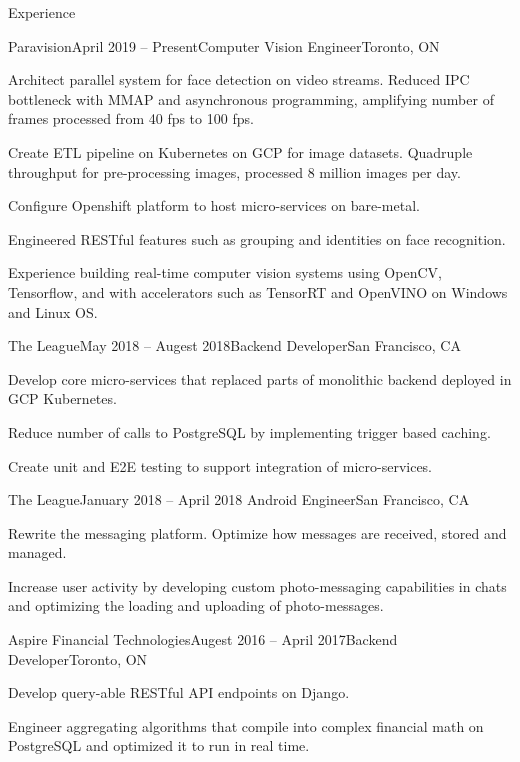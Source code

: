 \documentclass{resume}
\begin{document}
  \begin{rSection}{Experience}

    \begin{rSubsection}{Paravision}{April 2019 – Present}{Computer Vision Engineer}{Toronto, ON}
    \item Architect parallel system for face detection on video streams. Reduced IPC bottleneck with MMAP and asynchronous programming, amplifying number of frames processed from 40 fps to 100 fps.
    \item Create ETL pipeline on Kubernetes on GCP for image datasets. Quadruple throughput for pre-processing images, processed 8 million images per day.
    \item Configure Openshift platform to host micro-services on bare-metal.
    \item Engineered RESTful features such as grouping and identities on face recognition.
    \item Experience building real-time computer vision systems using OpenCV, Tensorflow, and with accelerators such as TensorRT and OpenVINO on Windows and Linux OS.
    \end{rSubsection}
    \vspace{-1em}
    \begin{rSubsection}{The League}{May 2018 – Augest 2018}{Backend Developer}{San Francisco, CA}
    \item Develop core micro-services that replaced parts of monolithic backend deployed in GCP Kubernetes.
    \item Reduce number of calls to PostgreSQL by implementing trigger based caching.
    \item Create unit and E2E testing to support integration of micro-services.
    \end{rSubsection}
    \vspace{-1em}
    \begin{rSubsection}{The League}{January 2018 – April 2018 }{Android Engineer}{San Francisco, CA}
    \item Rewrite the messaging platform. Optimize how messages are received, stored and managed.
    \item Increase user activity by developing custom photo-messaging capabilities in chats and optimizing the loading and uploading of photo-messages.
    \end{rSubsection}
    \vspace{-1em}
    \begin{rSubsection}{Aspire Financial Technologies}{Augest 2016 – April 2017}{Backend Developer}{Toronto, ON}
    \item Develop query-able RESTful API endpoints on Django.
    \item Engineer aggregating algorithms that compile into complex financial math on PostgreSQL and optimized it to run in real time.
    \end{rSubsection}
  \end{rSection}
\end{document}
